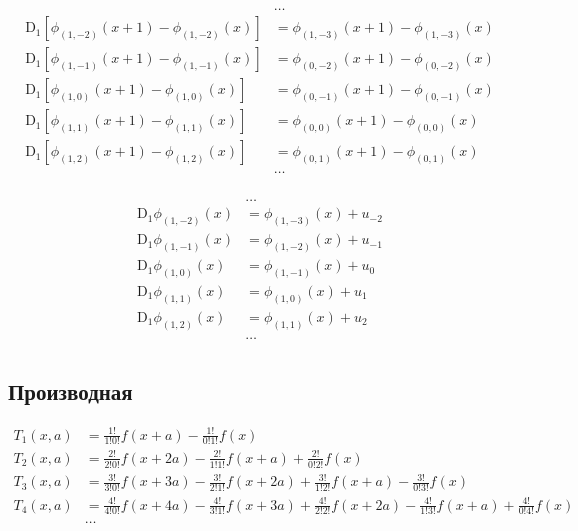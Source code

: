 \begin{equation*} \begin{aligned}
&\ldots \\
\mathrm{D}_1 \left[\phi_{(1,-2)}(x + 1) - \phi_{(1,-2)}(x) \right] &= \phi_{(1,-3)}(x + 1) - \phi_{(1,-3)}(x)
\\
\mathrm{D}_1 \left[\phi_{(1,-1)}(x + 1) - \phi_{(1,-1)}(x) \right] &= \phi_{(0,-2)}(x + 1) - \phi_{(0,-2)}(x)  
\\
\mathrm{D}_1 \left[\phi_{(1,0)}(x + 1) - \phi_{(1,0)}(x) \right] &= \phi_{(0,-1)}(x + 1) - \phi_{(0,-1)}(x)  
\\
\mathrm{D}_1 \left[\phi_{(1,1)}(x + 1) - \phi_{(1,1)}(x) \right] &= \phi_{(0,0)}(x + 1) - \phi_{(0,0)}(x)  
\\
\mathrm{D}_1 \left[\phi_{(1,2)}(x + 1) - \phi_{(1,2)}(x) \right] &= \phi_{(0,1)}(x + 1) - \phi_{(0,1)}(x)  
\\
&\ldots \\
\end{aligned} \end{equation*}

\begin{equation*} \begin{aligned}
&\ldots
\\
\mathrm{D}_1 \phi_{(1,-2)}(x) &= \phi_{(1,-3)}(x) + u_{-2}  
\\
\mathrm{D}_1 \phi_{(1,-1)}(x) &= \phi_{(1,-2)}(x) + u_{-1}  
\\
\mathrm{D}_1 \phi_{(1,0)}(x) &= \phi_{(1,-1)}(x) + u_0  
\\
\mathrm{D}_1 \phi_{(1,1)}(x) &= \phi_{(1,0)}(x) + u_1 
\\
\mathrm{D}_1 \phi_{(1,2)}(x) &= \phi_{(1,1)}(x) + u_2 
\\
&\ldots
\\
\end{aligned} \end{equation*}

\subsection{Производная}

\begin{equation*}
\begin{aligned}
T_1(x,a) &= 
  \frac{1!}{1!0!} f(x + a) 
- \frac{1!}{0!1!} f(x)
\\
T_2(x,a) &= 
  \frac{2!}{2!0!} f(x + 2 a) 
- \frac{2!}{1!1!} f(x + a) 
+ \frac{2!}{0!2!} f(x)
\\
T_3(x,a) &=
  \frac{3!}{3!0!} f(x + 3 a) 
- \frac{3!}{2!1!} f(x + 2 a) 
+ \frac{3!}{1!2!} f(x + a)
- \frac{3!}{0!3!} f(x)
\\
T_4(x,a) &= 
  \frac{4!}{4!0!} f(x + 4 a) 
- \frac{4!}{3!1!} f(x + 3 a) 
+ \frac{4!}{2!2!} f(x + 2 a) 
- \frac{4!}{1!3!} f(x + a) 
+ \frac{4!}{0!4!} f(x)
\\
&\ldots
\\
\end{aligned}
\end{equation*}


